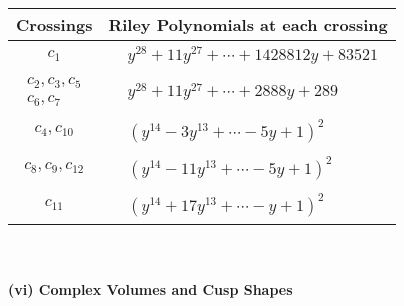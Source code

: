 \documentclass[1p]{elsarticle_modified}
\theoremstyle{definition}
\begin{document}
\begin{tabular}{m{50pt}|m{274pt}}
Crossings & \hspace{64pt}Riley Polynomials at each crossing \\
\hline $$\begin{aligned}c_{1}\end{aligned}$$&$\begin{aligned}
&y^{28}+11 y^{27}+\cdots+1428812 y+83521
\end{aligned}$\\
\hline $$\begin{aligned}c_{2},c_{3},c_{5}\\c_{6},c_{7}\end{aligned}$$&$\begin{aligned}
&y^{28}+11 y^{27}+\cdots+2888 y+289
\end{aligned}$\\
\hline $$\begin{aligned}c_{4},c_{10}\end{aligned}$$&$\begin{aligned}
&(y^{14}-3 y^{13}+\cdots-5 y+1)^{2}
\end{aligned}$\\
\hline $$\begin{aligned}c_{8},c_{9},c_{12}\end{aligned}$$&$\begin{aligned}
&(y^{14}-11 y^{13}+\cdots-5 y+1)^{2}
\end{aligned}$\\
\hline $$\begin{aligned}c_{11}\end{aligned}$$&$\begin{aligned}
&(y^{14}+17 y^{13}+\cdots- y+1)^{2}
\end{aligned}$\\
\hline
\end{tabular}\\~\\
\newpage\flushleft \textbf{(vi) Complex Volumes and Cusp Shapes}
\end{document}
